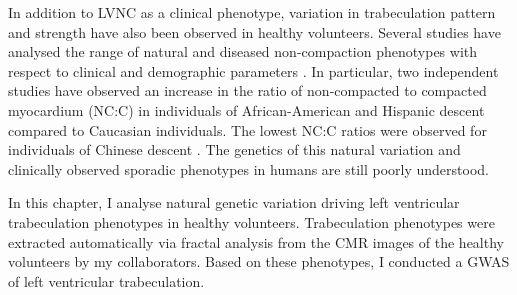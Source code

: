 In addition to LVNC as a clinical phenotype, variation in trabeculation pattern and strength have also been observed in healthy volunteers. Several studies have analysed the range of natural and diseased non-compaction phenotypes with respect to clinical and demographic parameters \citep{Petersen2005,Captur2014}.  In particular, two independent studies have observed an increase in the ratio of non-compacted to compacted myocardium (NC:C) in individuals of African-American and Hispanic descent compared to Caucasian individuals. The lowest NC:C ratios were observed for individuals of Chinese descent \citep{Kawel2012,Captur2015}. The genetics of this natural variation and clinically observed sporadic phenotypes in humans are still poorly understood. 

In this chapter, I analyse natural genetic variation driving left ventricular trabeculation phenotypes in healthy volunteers. Trabeculation phenotypes were extracted automatically via fractal analysis from the CMR images of the healthy volunteers by my collaborators. Based on these phenotypes, I conducted a GWAS of left ventricular trabeculation.


